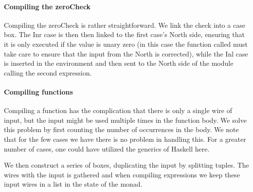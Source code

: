 \paragraph{Compiling the zeroCheck}
\label{sec:compiling-zerochk}

Compiling the zeroCheck is rather straightforward. We link the check into a case box. The Inr case is then then linked to the first case's North side, ensuring that it is only executed if the value is unary zero (in this case the function called must take care to ensure that the input from the North is corrected), while the Inl case is inserted in the environment and then sent to the North side of the module calling the second expression.


\paragraph{Compiling functions}
\label{sec:compiling-functions}

Compiling a function has the complication that there is only a single
wire of input, but the input might be used multiple times in the
function body. We solve this problem by first counting the number of
occurrences in the body. We note that for the few cases we have there
is no problem in handling this. For a greater number of cases, one could
have utilized the generics of Haskell here.

We then construct a series of boxes, duplicating the input by
splitting tuples. The wires with the input is gathered and when
compiling expressions we keep these input wires in a list in the state
of the monad.

